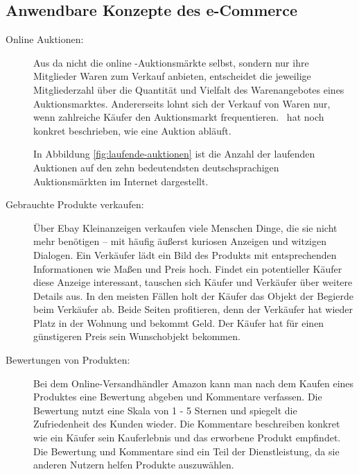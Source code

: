 \subsection{Anwendbare Konzepte des e-Commerce}

\begin{description}
\item[Online Auktionen:] Aus \textcite[Kapitel 4: Wirtschaftliche Bedeutung von Ebay, S. 71]{hinneburg} \glqq da nicht die online -Auktionsmärkte selbst, sondern nur ihre Mitglieder Waren zum Verkauf anbieten, entscheidet die jeweilige Mitgliederzahl über die Quantität und Vielfalt des Warenangebotes eines Auktionsmarktes. Andererseits lohnt sich der Verkauf von Waren nur, wenn zahlreiche Käufer den Auktionsmarkt frequentieren.\grqq ~\textcite[S. 72]{hinneburg} hat noch konkret beschrieben, wie eine Auktion abläuft.

In Abbildung \vref{fig:laufende-auktionen} ist die Anzahl der laufenden Auktionen auf den zehn bedeutendsten deutschsprachigen Auktionsmärkten im Internet dargestellt.

\item[Gebrauchte Produkte verkaufen: ] Über Ebay Kleinanzeigen verkaufen viele Menschen Dinge, die sie nicht mehr benötigen – mit häufig äußerst kuriosen Anzeigen und witzigen Dialogen. Ein Verkäufer lädt ein Bild des Produkts mit entsprechenden Informationen wie Maßen und Preis hoch. Findet ein potentieller Käufer diese Anzeige interessant, tauschen sich Käufer und Verkäufer über weitere Details aus. In den meisten Fällen holt der Käufer das Objekt der Begierde beim Verkäufer ab. Beide Seiten profitieren, denn der Verkäufer hat wieder Platz in der Wohnung und bekommt Geld. Der Käufer hat für einen günstigeren Preis sein Wunschobjekt bekommen.

\item[Bewertungen von Produkten: ] Bei dem Online-Versandhändler Amazon kann man nach dem Kaufen eines Produktes eine Bewertung abgeben und Kommentare verfassen. Die Bewertung nutzt eine Skala von 1 - 5 Sternen und spiegelt die Zufriedenheit des Kunden wieder. Die Kommentare beschreiben konkret wie ein Käufer sein Kauferlebnis und das erworbene Produkt empfindet. Die Bewertung und Kommentare sind ein Teil der Dienstleistung, da sie anderen Nutzern helfen Produkte auszuwählen.
\end{description}

